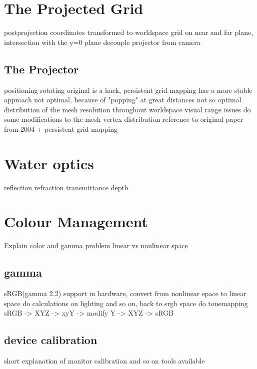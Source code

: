 \section{The Projected Grid}

postprojection coordinates transformed to worldspace
grid on near and far plane, intersection with the y=0 plane
decouple projector from camera

\subsection{The Projector}
positioning
rotating
original is a hack, persistent grid mapping has a more stable approach
not optimal, because of "popping" at great distances
not so optimal distribution of the mesh resolution throughout worldspace
visual range issues
do some modifications to the mesh vertex distribution
reference to original paper from 2004 + persistent grid mapping

\section{Water optics}
reflection
refraction
transmittance
depth

\section{Colour Management}

Explain color and gamma problem
linear vs nonlinear space

\subsection{gamma}
sRGB(gamma 2.2) support in hardware, convert from nonlinear space to linear
space do calculations on lighting and so on, back to srgb space
do tonemapping sRGB -> XYZ -> xyY -> modify Y -> XYZ -> sRGB

\subsection{device calibration}
short explanation of monitor calibration and so on
tools available


